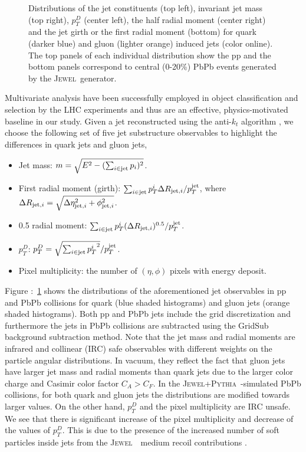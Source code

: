 \documentclass[notoc]{JHEP3}
\newcommand{\jw}{\textsc{Jewel}~}
\newcommand{\jwpy}{\textsc{Jewel+Pythia}~}
\begin{document}
\begin{figure}[h]
	   \caption{Distributions of the jet constituents (top left), invariant jet mass (top right), $p^{D}_{T}$ (center left), the half radial moment (center right) and the jet girth or the first radial moment (bottom) for quark (darker blue) and gluon (lighter orange) induced jets (color online). The top panels of each individual distribution show the pp and the bottom panels correspond to central (0-20\%) PbPb events generated by the \jw generator.}
	   \label{fig:jetdistributons_pp_pbpb}
	\end{figure}

Multivariate analysis have been successfully employed in object classification and selection by the LHC experiments \cite{} and thus are an effective, physics-motivated baseline in our study. Given a jet reconstructed using the anti-$k_{t}$ algorithm \cite{Cacciari:2008gp}, we choose the following set of five jet substructure observables \cite{} to highlight the differences in quark jets and gluon jets,
	\begin{itemize}
		\item Jet mass: $m = \sqrt{E^{2} - (\sum_{i\in {\rm jet}} p_i)^2}$. 
        		\item First radial moment (girth): $\sum_{i \in {\rm jet}} p^i_{T} \Delta R_{{\rm jet}, i}/p^{\rm jet}_{T}$, where $\Delta R_{{\rm jet}, i}=\sqrt{\Delta \eta^2_{{\rm jet}, i}+\phi^2_{{\rm jet}, i}}$.
		\item 0.5 radial moment:  $\sum_{i \in {\rm jet}} p^i_{T} (\Delta R_{{\rm jet}, i})^{0.5}/p^{\rm jet}_{T}$.
        		\item $p_{T}^{D}$: $p^{D}_{T} = \sqrt{\sum_{i \in {\rm jet}} {p^{i}_{T}}^2}/p^{\rm jet}_{T}$.
        		\item Pixel multiplicity: the number of $(\eta,\phi)$ pixels with energy deposit. %
	\end{itemize}

Figure :~\ref{fig:jetdistributons_pp_pbpb} shows the distributions of the aforementioned jet observables in pp and PbPb collisions for quark (blue shaded histograms) and gluon jets (orange shaded histograms). Both pp and PbPb jets include the grid discretization and furthermore the jets in PbPb collisions are subtracted using the GridSub background subtraction method. Note that the jet mass and radial moments are infrared and collinear (IRC) safe observables with different weights on the particle angular distributions. In vacuum, they reflect the fact that gluon jets have larger jet mass and radial moments than quark jets due to the larger color charge and Casimir color factor $C_A>C_F$. In the \jwpy-simulated PbPb collisions, for both quark and gluon jets the distributions are modified towards larger values. On the other hand, $p_T^D$ and the pixel multiplicity are IRC unsafe. We see that there is significant increase of the pixel multiplicity and decrease of the values of $p_T^D$. This is due to the presence of the increased number of soft particles inside jets from the \jw ~medium recoil contributions \cite{}.
\end{document}
